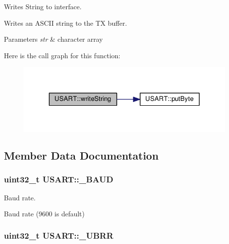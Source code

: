 Writes String to interface. 

Writes an A\+S\+C\+II string to the TX buffer.


\begin{DoxyParams}{Parameters}
{\em str} & character array \\
\hline
\end{DoxyParams}


Here is the call graph for this function\+:\nopagebreak
\begin{figure}[H]
\begin{center}
\leavevmode
\includegraphics[width=311pt]{classUSART_a249b0d6967ead56f39448d4954835a27_cgraph}
\end{center}
\end{figure}




\subsection{Member Data Documentation}
\subsubsection[{\texorpdfstring{\+\_\+\+B\+A\+UD}{_BAUD}}]{\setlength{\rightskip}{0pt plus 5cm}uint32\+\_\+t U\+S\+A\+R\+T\+::\+\_\+\+B\+A\+UD\hspace{0.3cm}{\ttfamily [private]}}\hypertarget{classUSART_adb222c3be48f5a559ed2dd9b4743edda}{}\label{classUSART_adb222c3be48f5a559ed2dd9b4743edda}


Baud rate. 

Baud rate (9600 is default) 
\subsubsection[{\texorpdfstring{\+\_\+\+U\+B\+RR}{_UBRR}}]{\setlength{\rightskip}{0pt plus 5cm}uint32\+\_\+t U\+S\+A\+R\+T\+::\+\_\+\+U\+B\+RR\hspace{0.3cm}{\ttfamily [private]}}\hypertarget{classUSART_acbd19517b595cf04ff087e040270904f}{}\label{classUSART_acbd19517b595cf04ff087e040270904f}


